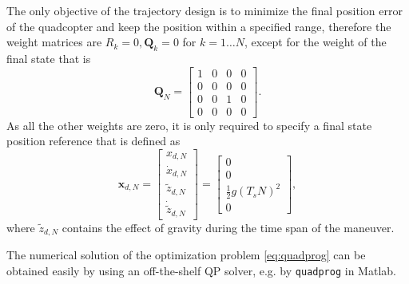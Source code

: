 The only objective of the trajectory design is to minimize the final position error of the quadcopter and keep the position within a specified range, therefore the weight matrices are $R_k = 0, \mathbf Q_k=0$ for $k=1\dots N$, except for the weight of the final state that is
\begin{equation}
\mathbf Q_N = \begin{bmatrix} 1 & 0 & 0 & 0 \\ 0 & 0 & 0 & 0 \\ 0 & 0 & 1 & 0 \\ 0 & 0 & 0 & 0 \end{bmatrix}.
\end{equation}
As all the other weights are zero, it is only required to specify a final state position reference that is defined as
\begin{equation}
    \mathbf x_{d,N} = \begin{bmatrix} x_{d,N} \\ \dot{x}_{d,N} \\ {\tilde{z}}_{d,N} \\ \dot{\tilde{z}}_{d,N} \end{bmatrix} = \begin{bmatrix} 0 \\ 0 \\ \frac{1}{2}g(T_s N)^2 \\ 0 \end{bmatrix},
\end{equation}
where ${\tilde{z}}_{d,N}$ contains the effect of gravity during the time span of the maneuver.

The numerical solution of the optimization problem \eqref{eq:quadprog} can be obtained easily by using an off-the-shelf QP solver, e.g. by \verb+quadprog+ in Matlab.  